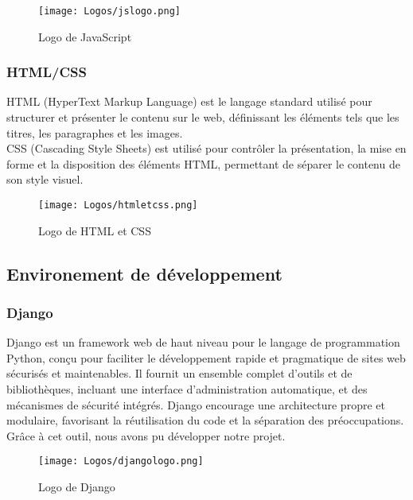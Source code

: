 \begin{figure}[h]
      \centering
        \texttt{[image: Logos/jslogo.png]}
        \caption{Logo de JavaScript}
\end{figure}

\subsubsection*{HTML/CSS}
HTML (HyperText Markup Language) est le langage standard utilisé pour structurer et présenter le contenu sur le web, définissant les éléments tels que les titres, les paragraphes et les images. \\
CSS (Cascading Style Sheets) est utilisé pour contrôler la présentation, la mise en forme et la disposition des éléments HTML, permettant de séparer le contenu de son style visuel.\\
\begin{figure}[h]
      \centering
        \texttt{[image: Logos/htmletcss.png]}
        \caption{Logo de HTML et CSS}
\end{figure}

\newpage
\subsection{Environement de développement}
\subsubsection*{Django}
Django est un framework web de haut niveau pour le langage de programmation Python, conçu pour faciliter le développement rapide et pragmatique de sites web sécurisés et maintenables. Il fournit un ensemble complet d'outils et de bibliothèques, incluant une interface d'administration automatique, et des mécanismes de sécurité intégrés. Django encourage une architecture propre et modulaire, favorisant la réutilisation du code et la séparation des préoccupations. \\
Grâce à cet outil, nous avons pu développer notre projet.\\
\begin{figure}[H]
      \centering
        \texttt{[image: Logos/djangologo.png]}
        \caption{Logo de Django}
\end{figure}

